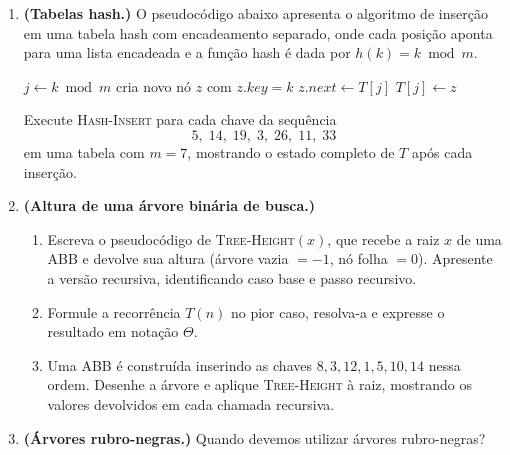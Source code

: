 \documentclass[9pt,a4paper]{extarticle}
\begin{document}
\begin{enumerate}[label=\textbf{\arabic*.}, leftmargin=*, itemsep=2em]
\item \textbf{(Tabelas hash.)} O pseudocódigo abaixo apresenta o algoritmo de
  inserção em uma tabela hash com encadeamento separado, onde cada posição aponta
  para uma lista encadeada e a função hash é dada por \(h(k) = k \bmod m\).

  \begin{algorithmic}[1]
      \State $j \gets k \bmod m$
      \State cria novo nó $z$ com $z.\mathit{key} = k$
      \State $z.\mathit{next} \gets T[j]$
      \State $T[j] \gets z$
    \EndProcedure
  \end{algorithmic}

  Execute \textsc{Hash-Insert} para cada chave da sequência
  \[
    5,\; 14,\; 19,\; 3,\; 26,\; 11,\; 33
  \]
  em uma tabela com \(m = 7\), mostrando o estado completo de \(T\) após cada
  inserção.

\item \textbf{(Altura de uma árvore binária de busca.)}

  \begin{enumerate}[label=(\alph*)]
    \item Escreva o pseudocódigo de \textsc{Tree-Height}$(x)$, que recebe a raiz
          \(x\) de uma ABB e devolve sua altura (árvore vazia $= -1$, nó folha $= 0$).
          Apresente a versão recursiva, identificando caso base e passo recursivo.
    \item Formule a recorrência \(T(n)\) no pior caso, resolva-a e expresse o
          resultado em notação \(\Theta\).
    \item Uma ABB é construída inserindo as chaves \(8, 3, 12, 1, 5, 10, 14\)
          nessa ordem. Desenhe a árvore e aplique \textsc{Tree-Height} à raiz,
          mostrando os valores devolvidos em cada chamada recursiva.
  \end{enumerate}

\item \textbf{(Árvores rubro-negras.)}
  Quando devemos utilizar árvores rubro-negras?

\end{enumerate}
\end{document}
